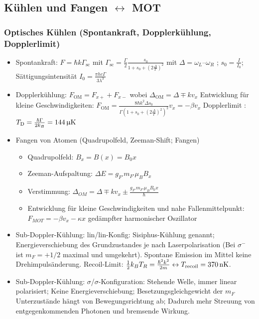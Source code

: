 \documentclass[10pt,a4paper]{extarticle}
\begin{document}
\subsection*{Kühlen und Fangen $\leftrightarrow$ MOT}
\subsubsection*{Optisches Kühlen (Spontankraft, Dopplerkühlung, Dopplerlimit)}
\begin{itemize}
\item Spontankraft: $F = \hbar k \Gamma_{\text{sc}}$ mit $\Gamma_{\text{sc}} =  \frac{\Gamma}{2} \frac{s_0}{1+s_0+\left(2\frac{\Delta}{\Gamma}\right)^2}$ mit $\Delta = \omega_L – \omega_R$ ; $s_0= \frac{I}{I_0}$; Sättigungsintensität $I_0=\frac{\pi h c \Gamma}{3\lambda^3}$
\item Dopplerkühlung: $F_{\text{OM}} = F_{x+} + F_{x-}$ wobei $\Delta_{\text{OM}} = \Delta \mp k v_x$
Entwicklung für kleine Geschwindigkeiten: $F_{\text{OM}} = \frac{8 \hbar k^2 \Delta s_0}{\Gamma (1+s_0 + \left(2 \frac{\Delta}{\Gamma}\right)^2)^2} v_x = -\beta v_x $
Dopplerlimit : $T_{\text{D}} = \frac{\hbar \Gamma}{2 k_B} = \unit[144]{\upmu K}$
\item Fangen von Atomen (Quadrupolfeld, Zeeman-Shift; Fangen)
\begin{itemize}
\item Quadrupolfeld:  $B_x = B(x) = B_0 x$
\item Zeeman-Aufspaltung: $\Delta E = g_{F'} m_{F'} \mu_B B_x$
\item Verstimmung: $\Delta_{OM} = \Delta \mp k v_x \pm \frac{g_{F'} m_{F'} \mu_B B_0 x}{\hbar}$
\item Entwicklung für kleine Geschwindigkeiten und nahe Fallenmittelpunkt: $F_{MOT} = - \beta v_x - \kappa x$ gedämpfter harmonischer Oszillator
\end{itemize}
\item Sub-Doppler-Kühlung: lin/lin-Konfig: Sisiphus-Kühlung genannt; Energieverschiebung des Grundzustandes je nach Laserpolarisation (Bei $\sigma^-$ ist $m_F=+1/2$ maximal und umgekehrt). Spontane Emission im Mittel keine Drehimpulsänderung. Recoil-Limit: $\frac{1}{2} k_B T_R = \frac{\hbar^2 k^2}{2m} \leftrightarrow T_{\mathrm{recoil}} = \unit[370]{nK}$.
\item Sub-Doppler-Kühlung: $\sigma$/$\sigma$-Konfiguration: Stehende Welle, immer linear polarisiert; Keine Energieverschiebung; Besetzungsgleichgewicht der $m_F$ Unterzustände hängt von Bewegungsrichtung ab; Dadurch mehr Streuung von entgegenkommenden Photonen und bremsende Wirkung.
\end{itemize}
\end{document}
